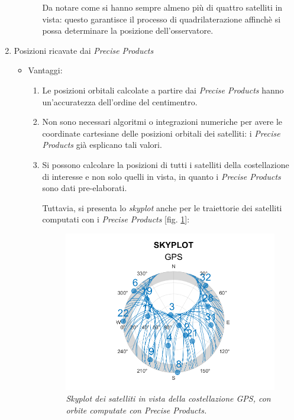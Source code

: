 \documentclass[a4paper,11pt,twoside]{book}
\begin{document}
\begin{enumerate}
\begin{itemize}[-]
\begin{enumerate}
			Da notare come si hanno sempre almeno più di quattro satelliti in vista: questo garantisce il processo di quadrilaterazione affinchè si possa determinare la posizione dell'osservatore.
				
			\end{enumerate}
		\end{itemize}
	
		\item Posizioni ricavate dai \textit{Precise Products}
		
		\begin{itemize}[-]
			\item Vantaggi:
			
			\begin{enumerate}
				\item Le posizioni orbitali calcolate a partire dai \textit{Precise Products} hanno un'accuratezza dell'ordine del centimentro.
				
				\item Non sono necessari algoritmi o integrazioni numeriche per avere le coordinate cartesiane delle posizioni orbitali dei satelliti: i \textit{Precise Products} già esplicano tali valori.
				
				\item Si possono calcolare la posizioni di tutti i satelliti della costellazione di interesse e non solo quelli in vista, in quanto i \textit{Precise Products} sono dati pre-elaborati.
				
				Tuttavia, si presenta lo \textit{skyplot} anche per le traiettorie dei satelliti computati con i \textit{Precise Products} [fig. \ref{fig:skyplotsp3}]:
				
				\begin{figure}[H]
					\centering
					\includegraphics[scale=0.55]{"Immagini workbook/Immagini esp2/skyplotsp3"}
					\caption{\textit{Skyplot dei satelliti in vista della costellazione GPS, con orbite computate con Precise Products.}}
					\label{fig:skyplotsp3}
				\end{figure}
			

\end{enumerate}
\end{itemize}
\end{enumerate}
\end{document}
